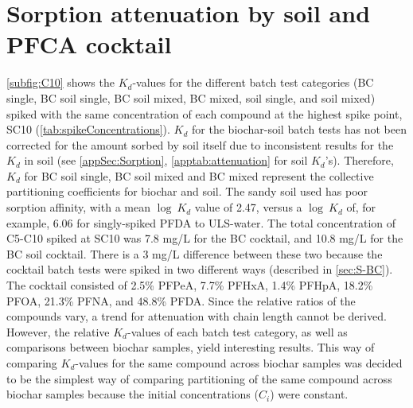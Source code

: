 
\section{Sorption attenuation by soil and PFCA cocktail}
\cref{subfig:C10} shows the $K_d$-values for the different batch test categories (BC single, BC soil single, BC soil mixed, BC mixed, soil single, and soil mixed) spiked with the same concentration of each compound at the highest spike point, SC10 (\cref{tab:spikeConcentrations}). $K_d$ for the biochar-soil batch tests has not been corrected for the amount sorbed by soil itself due to inconsistent results for the $K_d$ in soil (see \cref{appSec:Sorption}, \cref{apptab:attenuation} for soil $K_d$'s). Therefore, $K_d$ for BC soil single, BC soil mixed and BC mixed represent the collective partitioning coefficients for biochar and soil. The sandy soil used has poor sorption affinity, with a mean $\log~K_d$ value of 2.47, versus a $\log~K_d$ of, for example, 6.06 for singly-spiked PFDA to ULS-water. The total concentration of C5-C10 spiked at SC10 was 7.8 mg/L for the BC cocktail, and 10.8 mg/L for the BC soil cocktail. There is a 3 mg/L difference between these two because the cocktail batch tests were spiked in two different ways (described in \cref{sec:S-BC}). The cocktail consisted of 2.5\% PFPeA, 7.7\% PFHxA, 1.4\% PFHpA, 18.2\% PFOA, 21.3\% PFNA, and 48.8\% PFDA. Since the relative ratios of the compounds vary, a trend for attenuation with chain length cannot be derived. However, the relative $K_d$-values of each batch test category, as well as comparisons between biochar samples, yield interesting results. This way of comparing $K_d$-values for the same compound across biochar samples was decided to be the simplest way of comparing partitioning of the same compound across biochar samples because the initial concentrations ($C_i$) were constant.

